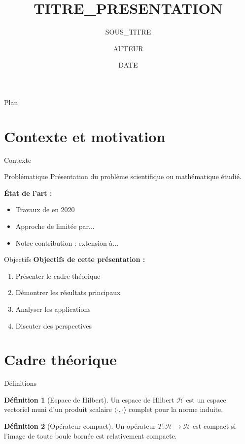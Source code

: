 \documentclass[11pt, aspectratio=169, xcolor={svgnames}]{beamer}
\title{{{TITRE_PRESENTATION}}}
\subtitle{{{SOUS_TITRE}}}
\author{{{AUTEUR}}}
\date{{{DATE}}}
\institute{%
  {{ETABLISSEMENT}} \\
  {{LABORATOIRE}} \\
  {{VILLE}}, {{PAYS}}
}
\theoremstyle{definition}
\newtheorem{definition}{Définition}
\begin{document}
\begin{frame}[plain]
  \titlepage
\end{frame}

\begin{frame}{Plan}
  \tableofcontents
\end{frame}

\section{Contexte et motivation}

\begin{frame}{Contexte}
  \begin{block}{Problématique}
    Présentation du problème scientifique ou mathématique étudié.
  \end{block}

  \vspace{0.5em}

  \textbf{État de l'art :}
  \begin{itemize}
    \item Travaux de \cite{reference1} en 2020
    \item Approche de \cite{reference2} limitée par...
    \item Notre contribution : extension à...
  \end{itemize}
\end{frame}

\begin{frame}{Objectifs}
  \textbf{Objectifs de cette présentation :}

  \begin{enumerate}
    \item Présenter le cadre théorique
    \item Démontrer les résultats principaux
    \item Analyser les applications
    \item Discuter des perspectives
  \end{enumerate}
\end{frame}

\section{Cadre théorique}

\begin{frame}{Définitions}
  \begin{definition}[Espace de Hilbert]
    Un espace de Hilbert $\mathcal{H}$ est un espace vectoriel muni d'un produit scalaire $\langle \cdot, \cdot \rangle$ complet pour la norme induite.
  \end{definition}

  \vspace{0.5em}

  \begin{definition}[Opérateur compact]
    Un opérateur $T : \mathcal{H} \to \mathcal{H}$ est compact si l'image de toute boule bornée est relativement compacte.
  \end{definition}
\end{frame}
\end{document}
